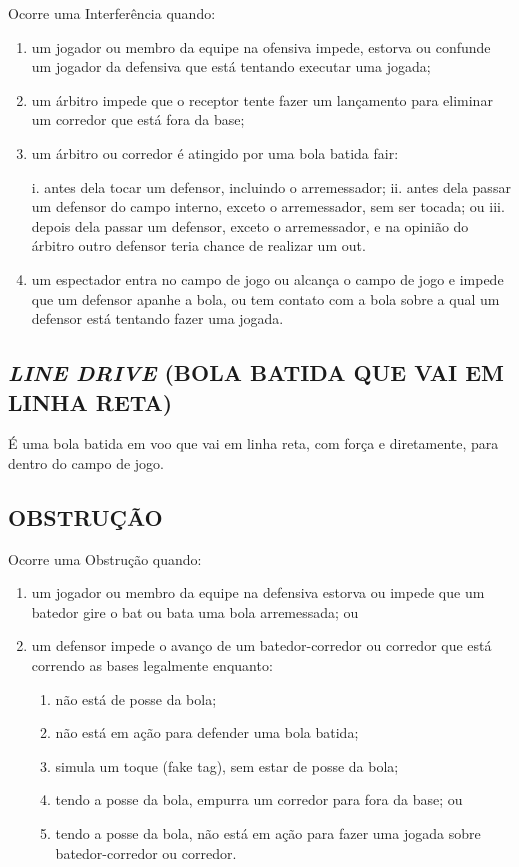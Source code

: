  Ocorre uma Interferência quando:

\begin{enumerate}[label=(\alph*)]
	\item   um jogador ou membro da equipe na ofensiva impede, estorva ou confunde um jogador da defensiva que está tentando executar uma jogada;
	\item  um árbitro impede que o receptor tente fazer um lançamento para eliminar um corredor que está fora da base;
	\item  um árbitro ou corredor é atingido por uma bola batida \gls{fair}:

	 i. antes dela tocar um defensor, incluindo o arremessador;
	 ii. antes dela passar um defensor do campo interno, exceto o arremessador, sem
	 ser tocada; ou
	 iii. depois dela passar um defensor, exceto o arremessador, e na opinião do árbitro outro defensor teria chance de realizar um \gls{out}.

	\item  um espectador entra no campo de jogo ou alcança o campo de jogo e impede que um defensor apanhe a bola, ou tem contato com a bola sobre a  qual um defensor está tentando fazer uma jogada.
\end{enumerate}

\subsection{\textit{LINE DRIVE} (BOLA BATIDA QUE VAI EM LINHA RETA)}

 É uma bola batida em voo que vai em linha reta, com força e diretamente, para dentro do campo de jogo.

\subsection{OBSTRUÇÃO}

Ocorre uma Obstrução quando:
\begin{enumerate}[label=(\alph*)]
	\item   um jogador ou membro da equipe na defensiva estorva ou impede que um batedor gire o \gls{bat} ou bata uma bola arremessada; ou
	\item  um defensor impede o avanço de um batedor-corredor ou corredor que está correndo as bases legalmente enquanto:

	\begin{enumerate}[label= \roman*.]
		\item não está de posse da bola;
		\item não está em ação para defender uma bola batida;
		\item simula um toque (\gls{fake tag}), sem estar de posse da bola;
		\item tendo a posse da bola, empurra um corredor para fora da base; ou
		\item tendo a posse da bola, não está em ação para fazer uma jogada sobre batedor-corredor ou corredor.
	\end{enumerate}
\end{enumerate}

